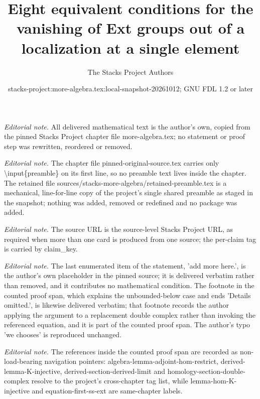 \documentclass[10pt,a4paper]{amsart}
\title{Eight equivalent conditions for the vanishing of Ext groups out of a localization at a single element}
\author{The Stacks Project Authors}
\date{stacks-project:more-algebra.tex:local-snapshot-20261012; GNU FDL 1.2 or later}
\theoremstyle{plain}
\theoremstyle{definition}
\theoremstyle{remark}
\numberwithin{equation}{subsection}
\begin{document}
\maketitle
\setcounter{subsection}{1}
\noindent\textit{Editorial note.} All delivered mathematical text is the author's own, copied from the pinned Stacks Project chapter file more-algebra.tex; no statement or proof step was rewritten, reordered or removed.\par\medskip
\noindent\textit{Editorial note.} The chapter file pinned-original-source.tex carries only \textbackslash{}input\{preamble\} on its first line, so no preamble text lives inside the chapter. The retained file sources/stacks-more-algebra/retained-preamble.tex is a mechanical, line-for-line copy of the project's single shared preamble as staged in the snapshot; nothing was added, removed or redefined and no package was added.\par\medskip
\noindent\textit{Editorial note.} The source URL is the source-level Stacks Project URL, as required when more than one card is produced from one source; the per-claim tag is carried by claim\_key.\par\medskip
\noindent\textit{Editorial note.} The last enumerated item of the statement, 'add more here.', is the author's own placeholder in the pinned source; it is delivered verbatim rather than removed, and it contributes no mathematical condition. The footnote in the counted proof span, which explains the unbounded-below case and ends 'Details omitted.', is likewise delivered verbatim; that footnote records the author applying the argument to a replacement double complex rather than invoking the referenced equation, and it is part of the counted proof span. The author's typo 'we chooses' is reproduced unchanged.\par\medskip
\noindent\textit{Editorial note.} The references inside the counted proof span are recorded as non-load-bearing navigation pointers: algebra-lemma-adjoint-hom-restrict, derived-lemma-K-injective, derived-section-derived-limit and homology-section-double-complex resolve to the project's cross-chapter tag list, while lemma-hom-K-injective and equation-first-ss-ext are same-chapter labels.\par\medskip
\end{document}
